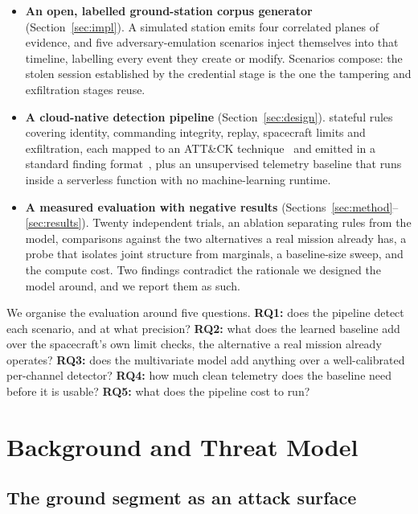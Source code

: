 \documentclass[10pt,journal]{IEEEtran}
\begin{document}
\begin{itemize}
  \item \textbf{An open, labelled ground-station corpus generator}
  (Section~\ref{sec:impl}). A simulated station emits four correlated planes of
  evidence, and five adversary-emulation scenarios inject themselves into that
  timeline, labelling every event they create or modify. Scenarios compose: the
  stolen session established by the credential stage is the one the tampering
  and exfiltration stages reuse.
  \item \textbf{A cloud-native detection pipeline} (Section~\ref{sec:design}).
  \expRuleCount{} stateful rules covering identity, commanding integrity,
  replay, spacecraft limits and exfiltration, each mapped to an ATT\&CK
  technique~\cite{attack} and emitted in a standard finding
  format~\cite{asff}, plus an unsupervised telemetry baseline that runs inside
  a serverless function with no machine-learning runtime.
  \item \textbf{A measured evaluation with negative results}
  (Sections~\ref{sec:method}--\ref{sec:results}). Twenty independent trials, an
  ablation separating rules from the model, comparisons against the two
  alternatives a real mission already has, a probe that isolates joint
  structure from marginals, a baseline-size sweep, and the compute cost. Two
  findings contradict the rationale we designed the model around, and we report
  them as such.
\end{itemize}

We organise the evaluation around five questions. \textbf{RQ1:} does the
pipeline detect each scenario, and at what precision? \textbf{RQ2:} what does
the learned baseline add over the spacecraft's own limit checks, the
alternative a real mission already operates? \textbf{RQ3:} does the
multivariate model add anything over a well-calibrated per-channel detector?
\textbf{RQ4:} how much clean telemetry does the baseline need before it is
usable? \textbf{RQ5:} what does the pipeline cost to run?

\section{Background and Threat Model}
\label{sec:background}

\subsection{The ground segment as an attack surface}
\end{document}
